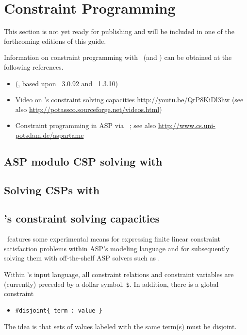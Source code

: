 \section{Constraint Programming}\label{sec:constraint}

This section is not yet ready for publishing
and will be included in one of the forthcoming editions of this guide.

Information on constraint programming with \gringo\ (and \clingcon) can be obtained at the following references.

\begin{itemize}
\item \cite{geossc09a,ostsch12a} (\clingcon, based upon \gringo~3.0.92 and \clasp~1.3.10)
\item Video on \gringo's constraint solving capacities \url{http://youtu.be/QrP8KiDl3hw} (see also \url{http://potassco.sourceforge.net/videos.html})
\item Constraint programming in ASP via \aspartame\ \cite{bageinscsotawe13a}; see also \url{http://www.cs.uni-potsdam.de/aspartame}
\end{itemize}

\subsection{ASP modulo CSP solving with \clingcon}
\label{sec:clingcon}

\subsection{Solving CSPs with \aspartame}
\label{sec:aspartame}

\subsection{\gringo's constraint solving capacities}

\gringo\ features some experimental means for expressing finite linear constraint satisfaction problems within ASP's modeling language and
for subsequently solving them with off-the-shelf ASP solvers such as \clasp.

Within \gringo's input language,
all constraint relations and constraint variables are (currently) preceded by a dollar symbol, \texttt{\$}.
In addition, there is a global constraint
\begin{itemize}
\item[] \texttt{\#disjoint\{ term : value \}}
\end{itemize}
The idea is that sets of values labeled with the same term(s) must be disjoint.

